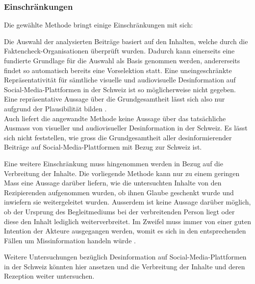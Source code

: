 \documentclass[12pt,a4paper]{article}        %
\begin{document}
\subsubsection{Einschränkungen}
Die gewählte Methode bringt einige Einschränkungen mit sich:

Die Auswahl der analysierten Beiträge basiert auf den Inhalten, welche durch die Faktencheck-Organisationen überprüft wurden. Dadurch kann einerseits eine fundierte Grundlage für die Auswahl als Basis genommen werden, andererseits findet so automatisch bereits eine Vorselektion statt. Eine uneingeschränkte Repräsentativität für sämtliche visuelle und audiovisuelle Desinformation auf Social-Media-Plattformen in der Schweiz ist so möglicherweise nicht gegeben. Eine repräsentative Aussage über die Grundgesamtheit lässt sich also nur aufgrund der Plausibilität bilden \parencite[vgl.\ dazu auch][12]{kessler_manuelle_2023}.
\\ Auch liefert die angewandte Methode keine Aussage über das tatsächliche Ausmass von visueller und audiovisueller Desinformation in der Schweiz. Es lässt sich nicht feststellen, wie gross die Grundgesamtheit aller desinformierender Beiträge auf Social-Media-Plattformen mit Bezug zur Schweiz ist.

Eine weitere Einschränkung muss hingenommen werden in Bezug auf die Verbreitung der Inhalte. Die vorliegende Methode kann nur zu einem geringen Mass eine Aussage darüber liefern, wie die untersuchten Inhalte von den Rezipierenden aufgenommen wurden, ob ihnen Glaube geschenkt wurde und inwiefern sie weitergeleitet wurden. Ausserdem ist keine Aussage darüber möglich, ob der Ursprung des Begleitmediums bei der verbreitenden Person liegt oder diese den Inhalt lediglich weiterverbreitet.
Im Zweifel muss immer von einer guten Intention der Akteure ausgegangen werden, womit es sich in den entsprechenden Fällen um Missinformation handeln würde \parencite[vgl.\ ][2]{bontridder_role_2021}.

Weitere Untersuchungen bezüglich Desinformation auf Social-Media-Plattformen in der Schweiz könnten hier ansetzen und die Verbreitung der Inhalte und deren Rezeption weiter untersuchen.
\end{document}
